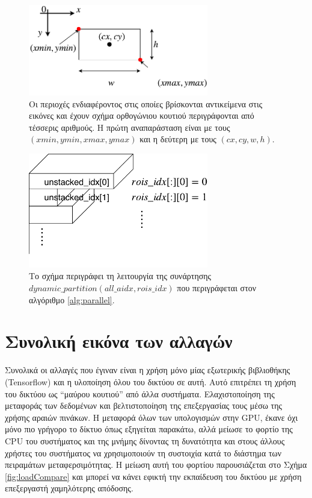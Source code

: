\begin{figure}
\centering
\includegraphics[width = 0.7\textwidth]{figures/experiments/bbox_presentation.pdf}
\caption[Αναπαράσταση ορθογωνίου περιοχής ενδιαφέροντος]{Οι περιοχές ενδιαφέροντος στις οποίες βρίσκονται αντικείμενα στις εικόνες και έχουν σχήμα ορθογώνιου κουτιού περιγράφονται από τέσσερις αριθμούς. Η πρώτη αναπαράσταση είναι με τους $(xmin,ymin,xmax,ymax)$ και η δεύτερη με τους $(cx,cy,w,h)$.}
\label{fig:bboxPresentation}
\end{figure}

\begin{figure}
\centering
\includegraphics[width = 0.7\textwidth]{figures/experiments/dynamic_partition.pdf}
\caption[Δυναμικός κατακερματισμός πίνακα]{Το σχήμα περιγράφει τη λειτουργία της συνάρτησης $dynamic\_partition(all\_aidx, rois\_idx)$ που περιγράφεται στον αλγόριθμο \ref{alg:parallel}.} 
\label{fig:dynamicPartition}
\end{figure}


\section{Συνολική εικόνα των αλλαγών}
Συνολικά οι αλλαγές που έγιναν είναι η χρήση μόνο μίας εξωτερικής βιβλιοθήκης (Tensorflow) και η υλοποίηση όλου του δικτύου σε αυτή. Αυτό επιτρέπει τη χρήση του δικτύου ως “μαύρου κουτιού” από άλλα συστήματα. Ελαχιστοποίηση της μεταφοράς των δεδομένων και βελτιστοποίηση της επεξεργασίας τους μέσω της χρήσης αραιών πινάκων. Η μεταφορά όλων των υπολογισμών στην GPU, έκανε όχι μόνο πιο γρήγορο το δίκτυο όπως εξηγείται παρακάτω, αλλά μείωσε το φορτίο της CPU του συστήματος και της μνήμης δίνοντας τη δυνατότητα και στους άλλους χρήστες του συστήματος  να χρησιμοποιούν τη συστοιχία κατά το διάστημα των πειραμάτων μεταφερσιμότητας. Η μείωση αυτή του φορτίου παρουσιάζεται στο Σχήμα \ref{fig:loadCompare} και μπορεί να κάνει εφικτή την εκπαίδευση του δικτύου με χρήση επεξεργαστή χαμηλότερης απόδοσης.


